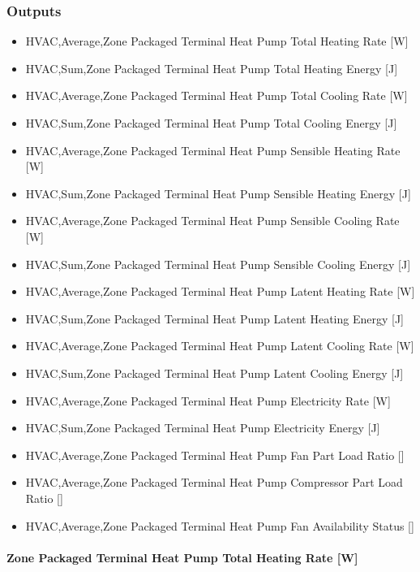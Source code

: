 \subsubsection{Outputs}\label{outputs-8-009}

\begin{itemize}
\item
  HVAC,Average,Zone Packaged Terminal Heat Pump Total Heating Rate {[}W{]}
\item
  HVAC,Sum,Zone Packaged Terminal Heat Pump Total Heating Energy {[}J{]}
\item
  HVAC,Average,Zone Packaged Terminal Heat Pump Total Cooling Rate {[}W{]}
\item
  HVAC,Sum,Zone Packaged Terminal Heat Pump Total Cooling Energy {[}J{]}
\item
  HVAC,Average,Zone Packaged Terminal Heat Pump Sensible Heating Rate {[}W{]}
\item
  HVAC,Sum,Zone Packaged Terminal Heat Pump Sensible Heating Energy {[}J{]}
\item
  HVAC,Average,Zone Packaged Terminal Heat Pump Sensible Cooling Rate {[}W{]}
\item
  HVAC,Sum,Zone Packaged Terminal Heat Pump Sensible Cooling Energy {[}J{]}
\item
  HVAC,Average,Zone Packaged Terminal Heat Pump Latent Heating Rate {[}W{]}
\item
  HVAC,Sum,Zone Packaged Terminal Heat Pump Latent Heating Energy {[}J{]}
\item
  HVAC,Average,Zone Packaged Terminal Heat Pump Latent Cooling Rate {[}W{]}
\item
  HVAC,Sum,Zone Packaged Terminal Heat Pump Latent Cooling Energy {[}J{]}
\item
  HVAC,Average,Zone Packaged Terminal Heat Pump Electricity Rate {[}W{]}
\item
  HVAC,Sum,Zone Packaged Terminal Heat Pump Electricity Energy {[}J{]}
\item
  HVAC,Average,Zone Packaged Terminal Heat Pump Fan Part Load Ratio {[]}
\item
  HVAC,Average,Zone Packaged Terminal Heat Pump Compressor Part Load Ratio {[]}
\item
  HVAC,Average,Zone Packaged Terminal Heat Pump Fan Availability Status {[]}
\end{itemize}

\paragraph{Zone Packaged Terminal Heat Pump Total Heating Rate {[}W{]}}\label{zone-packaged-terminal-heat-pump-total-heating-rate-w}

